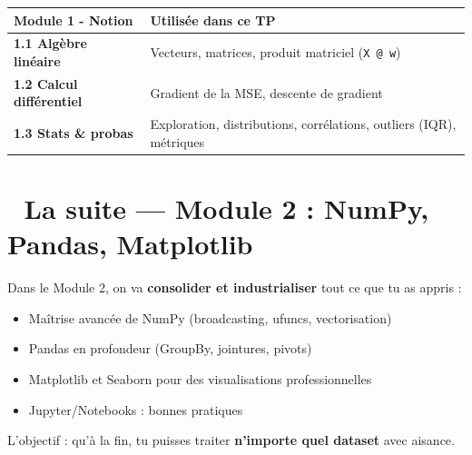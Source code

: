 \documentclass[
  french,
  11pt,
  a4paper,
]{scrbook}
\newcounter{none} %
\providecommand{\tightlist}{%
  \setlength{\itemsep}{0pt}\setlength{\parskip}{0pt}}
\begin{document}
{\def\LTcaptype{none} %
\begin{longtable}[]{@{}
  >{\raggedright\arraybackslash}p{}
  >{\raggedright\arraybackslash}p{}@{}}
\toprule\noalign{}
\begin{minipage}[b]{\linewidth}\raggedright
Module 1 - Notion
\end{minipage} & \begin{minipage}[b]{\linewidth}\raggedright
Utilisée dans ce TP
\end{minipage} \\
\midrule\noalign{}
\endhead
\bottomrule\noalign{}
\endlastfoot
\textbf{1.1 Algèbre linéaire} & Vecteurs, matrices, produit matriciel
(\texttt{X\ @\ w}) \\
\textbf{1.2 Calcul différentiel} & Gradient de la MSE, descente de
gradient \\
\textbf{1.3 Stats \& probas} & Exploration, distributions, corrélations,
outliers (IQR), métriques \\
\end{longtable}
}

\section{🚀 La suite --- Module 2 : NumPy, Pandas,
Matplotlib}\label{la-suite-module-2-numpy-pandas-matplotlib}

Dans le Module 2, on va \textbf{consolider et industrialiser} tout ce
que tu as appris :

\begin{itemize}
\tightlist
\item
  Maîtrise avancée de NumPy (broadcasting, ufuncs, vectorisation)
\item
  Pandas en profondeur (GroupBy, jointures, pivots)
\item
  Matplotlib et Seaborn pour des visualisations professionnelles
\item
  Jupyter/Notebooks : bonnes pratiques
\end{itemize}

L'objectif : qu'à la fin, tu puisses traiter \textbf{n'importe quel
dataset} avec aisance.
\end{document}

